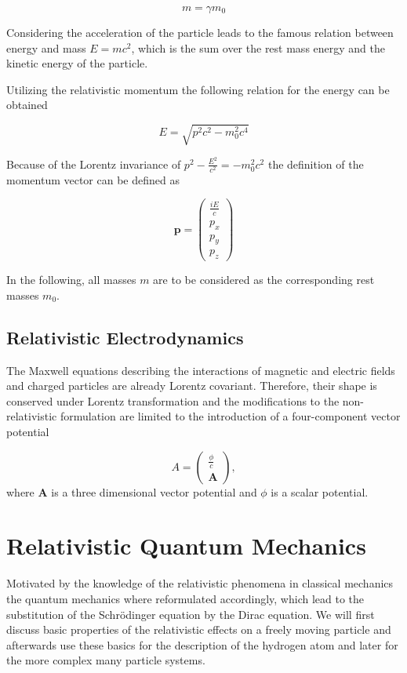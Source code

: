 \begin{equation}\label{relmasse}
m = \gamma m_0
\end{equation}

Considering the acceleration of the particle leads to the famous relation between
energy and mass $E=mc^2$, which is the sum over the rest mass energy and the
kinetic energy of the particle.

Utilizing the relativistic momentum the following relation for the energy can be
obtained

\begin{equation}\label{relE}
E = \sqrt{p^2c^2 - m_0^2c^4}
\end{equation}

Because of the Lorentz invariance of $p^2 -\frac{E^2}{c^2} = -m_0^2c^2$
the definition of the momentum vector can be defined as

\begin{equation}\label{viererp}
\mathbf{p} = \begin{pmatrix}\frac{iE}{c}\\p_x\\p_y\\p_z
\end{pmatrix}
\end{equation}

In the following, all masses $m$ are to be considered as the corresponding
rest masses $m_0$.

\subsection{Relativistic Electrodynamics}
The Maxwell equations describing the interactions of magnetic and electric fields
and charged particles are already Lorentz covariant. Therefore, their shape
is conserved under Lorentz transformation and the modifications to the
non-relativistic formulation are limited to the introduction of a four-component
vector potential

\begin{equation}
A = \begin{pmatrix}\frac{\phi}{c}\\\mathbf{A}\end{pmatrix},
\end{equation}
where $\mathbf{A}$ is a three dimensional vector potential and $\phi$ is a scalar
potential.



\section{Relativistic Quantum Mechanics}
Motivated by the knowledge of the relativistic phenomena in classical mechanics
the quantum mechanics where reformulated accordingly, which lead to the substitution
of the Schrödinger equation by the Dirac equation. We will first discuss basic
properties of the relativistic effects on a freely moving particle and afterwards
use these basics for the description of the hydrogen atom and later for the more
complex many particle systems.

